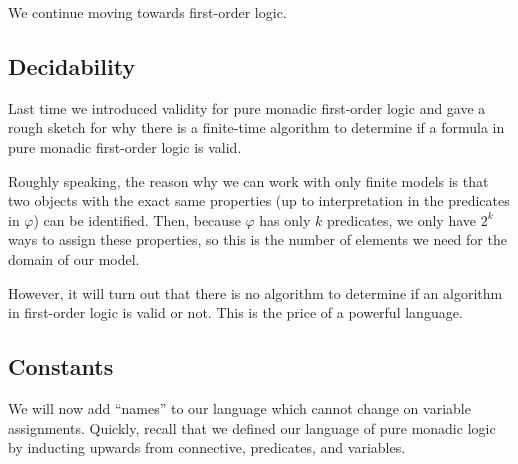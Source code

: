 
We continue moving towards first-order logic.

\subsection{Decidability}
Last time we introduced validity for pure monadic first-order logic and gave a rough sketch for why there is a finite-time algorithm to determine if a formula in pure monadic first-order logic is valid.
\begin{remark}
	Roughly speaking, the reason why we can work with only finite models is that two objects with the exact same properties (up to interpretation in the predicates in $\varphi$) can be identified. Then, because $\varphi$ has only $k$ predicates, we only have $2^k$ ways to assign these properties, so this is the number of elements we need for the domain of our model.
\end{remark}
However, it will turn out that there is no algorithm to determine if an algorithm in first-order logic is valid or not. This is the price of a powerful language.

\subsection{Constants}
We will now add ``names'' to our language which cannot change on variable assignments. Quickly, recall that we defined our language of pure monadic logic by inducting upwards from connective, predicates, and variables.

